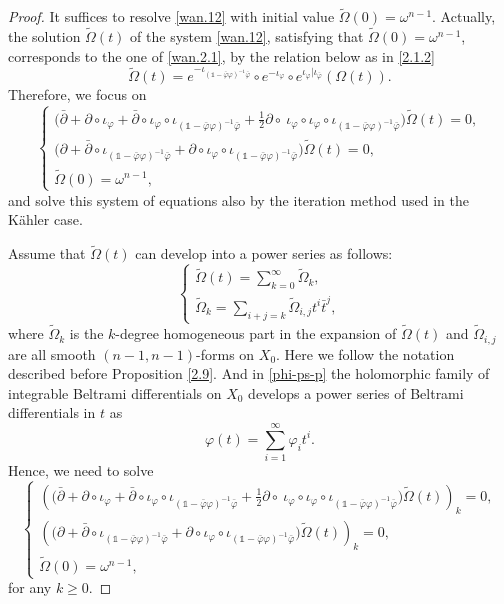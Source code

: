 \documentclass[12pt]{amsart}
\numberwithin{equation}{section}
\renewcommand{\1}{\mathds{1}}
\renewcommand{\>}{\rightarrow}
\newcommand{\p}{\partial}
\def\p{\partial}
\def\b{\bar}
\begin{document}
\begin{proof}
It suffices to resolve \eqref{wan.12} with  initial value
$\tilde{\Omega}(0)=\omega^{n-1}$. Actually, the solution
$\tilde{\Omega}(t)$ of the system \eqref{wan.12}, satisfying that
$\tilde{\Omega}(0)=\omega^{n-1}$, corresponds to the one of
\eqref{wan.2.1}, by the relation below as in \eqref{2.1.2}
\[
\tilde{\Omega}(t)=e^{-\iota_{(\1-\b{\varphi}\varphi)^{-1}\b{\varphi}}}\circ
e^{-\iota_{\varphi}}\circ
e^{\iota_{\varphi}|\iota_{\b{\varphi}}}(\Omega(t)).
\]
Therefore, we focus on
$$
    \begin{cases}
      \big(\b{\p}+\p\circ \iota_{\varphi}+\b{\p}\circ \iota_{\varphi}\circ \iota_{(\1-\b{\varphi}\varphi)^{-1}\b{\varphi}}+\frac{1}{2}\p\circ\ \iota_{\varphi}\circ \iota_{\varphi}\circ \iota_{(\1-\b{\varphi}\varphi)^{-1}\b{\varphi}}\big)\tilde{\Omega}(t)=0,\\
      \big(\p+\b{\p}\circ \iota_{(\1-\b{\varphi}\varphi)^{-1}\b{\varphi}}+\p\circ \iota_{\varphi}\circ \iota_{(\1-\b{\varphi}\varphi)^{-1}\b{\varphi}}\big)\tilde{\Omega}(t)=0,\\
      \tilde{\Omega}(0)=\omega^{n-1},
    \end{cases}
$$
and solve this system of equations also by the iteration method used
in the K\"ahler case.

Assume that $\tilde{\Omega}(t)$ can develop into a power series as
follows:
\begin{equation*}
    \begin{cases}
      \tilde{\Omega}(t)=\sum_{k=0}^{\infty}\tilde{\Omega}_k,\\
      \tilde{\Omega}_k=\sum_{i+j=k}\tilde{\Omega}_{i,j}t^i\b{t}^j,
    \end{cases}
\end{equation*}
where $\tilde{\Omega}_k$ is the $k$-degree homogeneous part in the
expansion of $\tilde{\Omega}(t)$  and $\tilde{\Omega}_{i,j}$ are all
smooth $(n-1,n-1)$-forms on $X_0$. Here we follow the notation
described before Proposition \ref{2.9}. And in \eqref{phi-ps-p} the
holomorphic family of integrable Beltrami differentials on $X_0$ develops a power series of Beltrami
differentials in $t$ as
$$
\varphi(t) = \sum_{i=1}^{\infty}\varphi_{i}t^i.
$$
Hence, we need to
solve
\begin{equation}\label{wan.16}
    \begin{cases}
      \left(\big(\b{\p}+\p\circ \iota_{\varphi}+\b{\p}\circ \iota_{\varphi}\circ \iota_{(\1-\b{\varphi}\varphi)^{-1}\b{\varphi}}+\frac{1}{2}\p\circ\ \iota_{\varphi}\circ \iota_{\varphi}\circ \iota_{(\1-\b{\varphi}\varphi)^{-1}\b{\varphi}}\big)\tilde{\Omega}(t)\right)_k=0,\\
      \left(\big(\p+\b{\p}\circ \iota_{(\1-\b{\varphi}\varphi)^{-1}\b{\varphi}}+\p\circ \iota_{\varphi}\circ \iota_{(\1-\b{\varphi}\varphi)^{-1}\b{\varphi}}\big)\tilde{\Omega}(t)\right)_k=0,\\
      \tilde{\Omega}(0)=\omega^{n-1},
    \end{cases}
\end{equation}
for any $k\geq 0$.


\end{proof}
\end{document}
